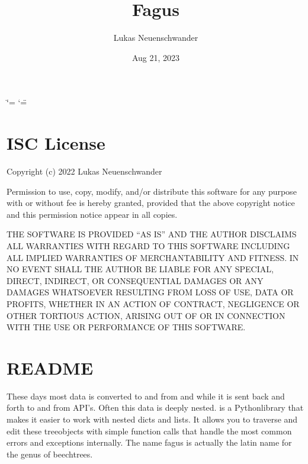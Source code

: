 \documentclass[a4paper,10pt,english]{sphinxmanual}
\title{Fagus}
\date{Aug 21, 2023}
\author{Lukas Neuenschwander}
\begin{document}
\ifdefined\shorthandoff
  \ifnum\catcode`\=\string=\active\shorthandoff{=}\fi
  \ifnum\catcode`\"=\active{}\fi
\fi

\pagestyle{empty}
\sphinxmaketitle
\pagestyle{plain}
\sphinxtableofcontents
\pagestyle{normal}
\label{\detokenize{index::doc}}


\sphinxstepscope


\chapter{ISC License}
\label{\detokenize{LICENSE:isc-license}}\label{\detokenize{LICENSE::doc}}
\sphinxAtStartPar
Copyright (c) 2022 Lukas Neuenschwander

\sphinxAtStartPar
Permission to use, copy, modify, and/or distribute this software for any purpose with or without fee is hereby granted, provided that the above copyright notice and this permission notice appear in all copies.

\sphinxAtStartPar
THE SOFTWARE IS PROVIDED “AS IS” AND THE AUTHOR DISCLAIMS ALL WARRANTIES WITH REGARD TO THIS SOFTWARE INCLUDING ALL IMPLIED WARRANTIES OF MERCHANTABILITY AND FITNESS. IN NO EVENT SHALL THE AUTHOR BE LIABLE FOR ANY SPECIAL, DIRECT, INDIRECT, OR CONSEQUENTIAL DAMAGES OR ANY DAMAGES WHATSOEVER RESULTING FROM LOSS OF USE, DATA OR PROFITS, WHETHER IN AN ACTION OF CONTRACT, NEGLIGENCE OR OTHER TORTIOUS ACTION, ARISING OUT OF OR IN CONNECTION WITH THE USE OR PERFORMANCE OF THIS SOFTWARE.

\sphinxstepscope


\chapter{README}
\label{\detokenize{README:readme}}\label{\detokenize{README::doc}}
\sphinxAtStartPar
These days most data is converted to and from  and  while it is sent back and forth to and from API’s. Often this data is deeply nested.  is a Python\sphinxhyphen{}library that makes it easier to work with nested dicts and lists. It allows you to traverse and edit these tree\sphinxhyphen{}objects with simple function calls that handle the most common errors and exceptions internally. The name fagus is actually the latin name for the genus of beech\sphinxhyphen{}trees.
\end{document}
